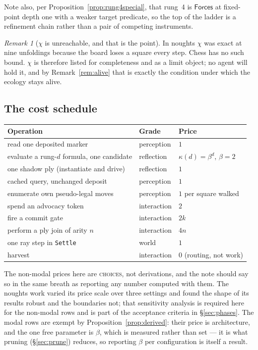 \documentclass[11pt,a4paper]{article}
\theoremstyle{plain}
\theoremstyle{definition}
\theoremstyle{remark}
\newtheorem{remark}[theorem]{Remark}
\begin{document}
Note also, per Proposition~\ref{prop:rung4special}, that rung~4 is
$\mathsf{Forces}$ at fixed-point depth one with a weaker target predicate, so
the top of the ladder is a refinement chain rather than a pair of competing
instruments.

\begin{remark}[$\chi$ is unreachable, and that is the point]
\label{rem:chi}
In noughts $\chi$ was exact at nine unfoldings because the board loses a square
every step. Chess has no such bound. $\chi$ is therefore listed for completeness
and as a limit object; no agent will hold it, and by Remark~\ref{rem:alive} that
is exactly the condition under which the ecology stays alive.
\end{remark}

\subsection{The cost schedule}
\label{sec:cost}

\begin{center}
\begin{tabular}{@{}lll@{}}
\toprule
Operation & Grade & Price \\
\midrule
read one deposited marker              & perception  & $1$ \\
evaluate a rung-$d$ formula, one candidate & reflection & $\kappa(d) = \beta^d$, $\beta = 2$ \\
one shadow ply (instantiate and drive)  & reflection  & $1$ \\
cached query, unchanged deposit        & perception  & $1$ \\
enumerate own pseudo-legal moves       & perception  & $1$ per square walked \\
spend an advocacy token                & interaction & $2$ \\
fire a commit gate                     & interaction & $2k$ \\
perform a ply join of arity $n$        & interaction & $4n$ \\
one ray step in \texttt{Settle}        & world        & $1$ \\
harvest                                & interaction & $0$ (routing, not work) \\
\bottomrule
\end{tabular}
\end{center}

The non-modal prices here are \textsc{choices}, not derivations, and the note
should say so in the same breath as reporting any number computed with them. The
noughts work varied its price scale over three settings and found the shape of
its results robust and the boundaries not; that sensitivity analysis is required
here for the non-modal rows and is part of the acceptance criteria in
\S\ref{sec:phases}. The modal rows are exempt by
Proposition~\ref{prop:derived}: their price is architecture, and the one free
parameter is $\beta$, which is measured rather than set --- it is what pruning
(\S\ref{sec:prune}) reduces, so reporting $\beta$ per configuration is itself
a result.
\end{document}
